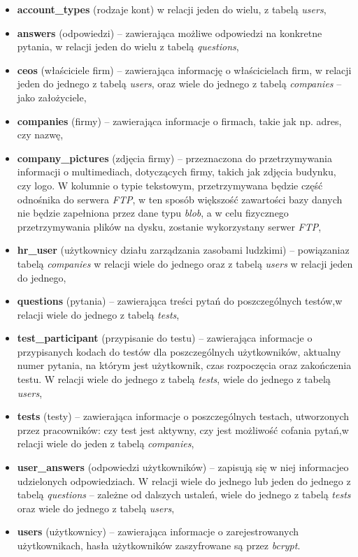 \documentclass[twoside]{projektInzynierskiMS}
\numberwithin{figure}{section}
\begin{document}
\begin{itemize}
    \item \textbf{account\_types} (rodzaje kont) w relacji jeden do wielu, z tabelą \textit{users},
    \item \textbf{answers} (odpowiedzi) – zawierająca możliwe odpowiedzi na konkretne pytania, w relacji jeden do wielu z tabelą  \textit{questions},
    \item \textbf{ceos} (właściciele firm) – zawierająca informację o właścicielach firm, w relacji jeden do jednego z tabelą \textit{users}, oraz wiele do jednego z tabelą \textit{companies} – jako założyciele,
    \item \textbf{companies} (firmy) – zawierająca informacje o firmach, takie jak np. adres, czy nazwę,
    \item \textbf{company\_pictures} (zdjęcia firmy) – przeznaczona do przetrzymywania informacji o multimediach, dotyczących firmy, takich jak zdjęcia budynku, czy logo. W kolumnie o typie tekstowym, przetrzymywana będzie część odnośnika do serwera \textit{FTP}, w ten sposób większość zawartości bazy danych nie będzie zapełniona przez dane typu \textit{blob}, a w celu fizycznego przetrzymywania plików na dysku, zostanie wykorzystany serwer \textit{FTP},
    \item \textbf{hr\_user} (użytkownicy działu zarządzania zasobami ludzkimi) – powiązania\linebreak z tabelą \textit{companies} w relacji wiele do jednego oraz z tabelą \textit{users} w relacji jeden do jednego,
    \item \textbf{questions} (pytania) – zawierająca treści pytań do poszczególnych testów,\linebreak w relacji wiele do jednego z tabelą \textit{tests},
    \item \textbf{test\_participant} (przypisanie do testu) – zawierająca informacje o przypisanych kodach do testów dla poszczególnych użytkowników, aktualny numer pytania, na którym jest użytkownik, czas rozpoczęcia oraz zakończenia testu. W relacji wiele do jednego z tabelą \textit{tests}, wiele do jednego z tabelą \textit{users},
    \item \textbf{tests} (testy) – zawierająca informacje o poszczególnych testach, utworzonych przez pracowników: czy test jest aktywny, czy jest możliwość cofania pytań,\linebreak w relacji wiele do jeden z tabelą \textit{companies},
    \item \textbf{user\_answers} (odpowiedzi użytkowników) – zapisują się w niej informacje\linebreak  o udzielonych odpowiedziach. W relacji wiele do jednego lub jeden do jednego z tabelą \textit{questions} -- zależne od dalszych ustaleń, wiele do jednego z tabelą \textit{tests} oraz wiele do jednego z tabelą \textit{users},
    \item \textbf{users} (użytkownicy) – zawierająca informacje o zarejestrowanych użytkownikach, hasła użytkowników zaszyfrowane są przez \textit{bcrypt}.
\end{itemize}
\end{document}
